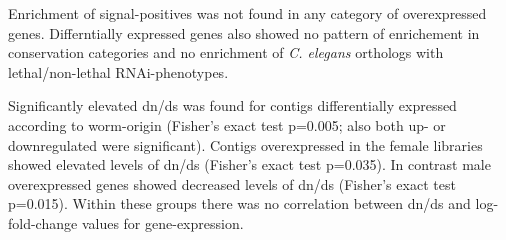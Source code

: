 Enrichment of signal-positives was not found in any category of
overexpressed genes. Differntially expressed genes also showed no
pattern of enrichement in conservation categories and no enrichment of
\textit{C. elegans} orthologs with lethal/non-lethal RNAi-phenotypes.

Significantly elevated dn/ds was found for contigs differentially
expressed according to worm-origin (Fisher's exact test p=0.005; also
both up- or downregulated were significant). Contigs overexpressed in
the female libraries showed elevated levels of dn/ds (Fisher's exact
test p=0.035). In contrast male overexpressed genes showed decreased
levels of dn/ds (Fisher's exact test p=0.015). Within these groups
there was no correlation between dn/ds and log-fold-change values for
gene-expression.




